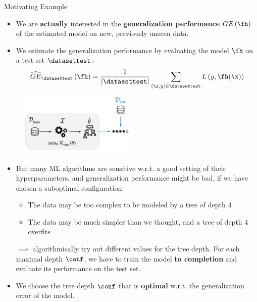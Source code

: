 \begin{frame}{Motivating Example}
\begin{itemize}
\item We are \textbf{actually} interested in the \textbf{generalization performance} $GE\left(\fh\right)$ of the estimated model on new, previously unseen data.
\item We estimate the generalization performance by evaluating the model $\fh$ on a test set $\datasettest$: $$
\widehat{GE}_{\datasettest}\left(\fh\right) = \frac{1}{|\datasettest|} \sum\limits_{(\x, y) \in \datasettest} L\left(y, \fh(\x) \right)
$$
\end{itemize}
\vspace*{-0.6cm}
\begin{center}
\begin{figure}
\includegraphics[width=0.5\textwidth]{images/riskmin_bilevel2.png}
\end{figure}
\end{center}

\framebreak

\begin{itemize}
\vfill
\item But many ML algorithms are sensitive w.r.t. a good setting of their hyperparameters,
and generalization performance might be bad, if we have chosen a suboptimal configuration:
\begin{itemize}
\vfill
\item The data may be too complex to be modeled by a tree of depth $4$
\vfill
\item The data may be much simpler than we thought, and a tree of depth $4$ overfits
\end{itemize}
\vfill
\item[$\implies$] algorithmically try out different values for the tree depth. For each maximal depth $\conf$, we have to train the model \textbf{to completion} and evaluate its performance on the test set.
\vfill
\item We choose the tree depth $\conf$ that is \textbf{optimal} w.r.t. the generalization error of the model.
\end{itemize}


\end{frame}

